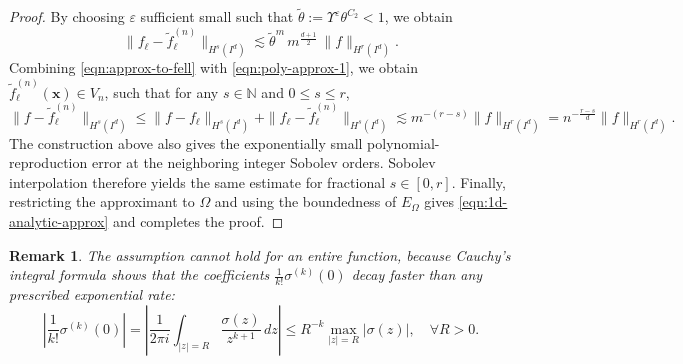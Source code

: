 \documentclass{article}
\numberwithin{equation}{section}
\newtheorem{remark}{Remark}
\def\NN{\mathbb{N}}
\def\lt{\left}
\def\rt{\right}
\def\bx{{\bm x}}
\begin{document}
\begin{proof}
    By choosing $\varepsilon$ sufficient small such that $\tilde\theta:=\Upsilon^\varepsilon\theta^{C_2} < 1$, we obtain 
    \begin{equation}\label{eqn:approx-to-fell}
        \|f_\ell-\widetilde{f}_\ell^{(n)}\|_{H^s(I^d)} \lesssim \tilde\theta^m\, m^{\frac{d+1}{2}}\,\|f\|_{H^r(I^d)}.
    \end{equation} 
    Combining \eqref{eqn:approx-to-fell} with \eqref{eqn:poly-approx-1}, we obtain $\widetilde{f}_\ell^{(n)}(\bx)\in V_n$, such that for any $s\in \NN$ and $0\leq s\leq r$, 
    $$\|f-\widetilde{f}_\ell^{(n)}\|_{H^s(I^d)}\leq \|f-f_\ell\|_{H^s(I^d)} + \|f_\ell -\widetilde{f}_\ell^{(n)}\|_{H^s(I^d)} \lesssim m^{-(r-s)}\|f\|_{H^r(I^d)}=n^{-\frac{r-s}{d}}\|f\|_{H^r(I^d)}. $$
    The construction above also gives the exponentially small polynomial-reproduction error at the neighboring integer Sobolev orders. Sobolev interpolation therefore yields the same estimate for fractional $s\in[0,r]$. Finally, restricting the approximant to $\Omega$ and using the boundedness of $E_\Omega$ gives \eqref{eqn:1d-analytic-approx} and completes the proof.
\end{proof}

\begin{remark}
    The assumption cannot hold for an entire function, because Cauchy's integral formula shows that the coefficients $\frac{1}{k!}\sigma^{(k)}(0)$ decay faster than any prescribed exponential rate:
    $$
    \lt|\frac{1}{k!}\sigma^{(k)}(0)\rt| = \lt|\frac{1}{2\pi i} \int_{|z|=R} \frac{\sigma(z)}{z^{k+1}}\,dz\rt| 
    \leq R^{-k}\max_{|z|=R} |\sigma(z)|, \quad \forall R>0.
    $$
\end{remark}
\end{document}
